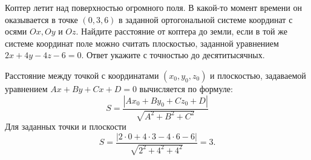 
Коптер летит над поверхностью огромного поля. 
В какой-то момент времени он оказывается в точке $(0,3,6)$ в заданной ортогональной системе координат с осями $Ox, Oy$ и $Oz$. 
Найдите расстояние от коптера до земли, если в той же системе координат поле можно считать плоскостью, 
заданной уравнением $2x+4y-4z-6=0$. Ответ укажите с точностью до десятитысячных.

\soultionSection

Расстояние между точкой с координатами $(x_0, y_0, z_0)$ и плоскостью, задаваемой уравнением $Ax + By + Cx + D = 0$ вычисляется по формуле:
$$S = \frac{|Ax_0+By_0+Cz_0 + D|}{\sqrt{A^2+B^2+C^2}}$$
Для заданных точки и плоскости $$S = \frac{|2 \cdot 0 + 4 \cdot 3 - 4 \cdot 6 - 6|}{\sqrt{2^2 + 4^2 + 4^2}} = 3.$$

